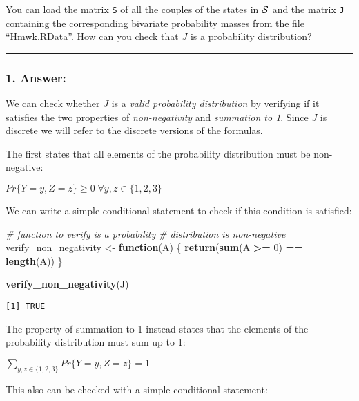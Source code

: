\documentclass[
]{article}
\newenvironment{Shaded}{\begin{snugshade}}{\end{snugshade}}
\newcommand{\CommentTok}[1]{\textcolor[rgb]{0.56,0.35,0.01}{\textit{#1}}}
\newcommand{\ControlFlowTok}[1]{\textcolor[rgb]{0.13,0.29,0.53}{\textbf{#1}}}
\newcommand{\DecValTok}[1]{\textcolor[rgb]{0.00,0.00,0.81}{#1}}
\newcommand{\FunctionTok}[1]{\textcolor[rgb]{0.13,0.29,0.53}{\textbf{#1}}}
\newcommand{\NormalTok}[1]{#1}
\newcommand{\OtherTok}[1]{\textcolor[rgb]{0.56,0.35,0.01}{#1}}
\newcommand{\SpecialCharTok}[1]{\textcolor[rgb]{0.81,0.36,0.00}{\textbf{#1}}}
\begin{document}
You can load the matrix \texttt{S} of all the couples of the states in
\({\cal S}\) and the matrix \texttt{J} containing the corresponding
bivariate probability masses from the file ``Hmwk.RData''. How can you
check that \(J\) is a probability distribution?

\begin{center}\rule{0.5\linewidth}{0.5pt}\end{center}

\hypertarget{answer}{%
\subsubsection{1. Answer:}\label{answer}}

We can check whether \(J\) is a \emph{valid probability distribution} by
verifying if it satisfies the two properties of \emph{non-negativity}
and \emph{summation to 1}. Since \(J\) is discrete we will refer to the
discrete versions of the formulas.

The first states that all elements of the probability distribution must
be non-negative:

\(Pr \{Y=y,Z=z\} \ge 0 \; \forall y,z \in \{1, 2, 3\}\)

We can write a simple conditional statement to check if this condition
is satisfied:

\begin{Shaded}
\begin{Highlighting}[]
\CommentTok{\# function to verify is a probability}
\CommentTok{\# distribution is non{-}negative}
\NormalTok{verify\_non\_negativity }\OtherTok{\textless{}{-}} \ControlFlowTok{function}\NormalTok{(A) \{}
    \FunctionTok{return}\NormalTok{(}\FunctionTok{sum}\NormalTok{(A }\SpecialCharTok{\textgreater{}=} \DecValTok{0}\NormalTok{) }\SpecialCharTok{==} \FunctionTok{length}\NormalTok{(A))}
\NormalTok{\}}

\FunctionTok{verify\_non\_negativity}\NormalTok{(J)}
\end{Highlighting}
\end{Shaded}

\begin{verbatim}
[1] TRUE
\end{verbatim}

The property of summation to 1 instead states that the elements of the
probability distribution must sum up to 1:

\(\sum_{y,z\in\{1,2,3\}}Pr\{Y=y,Z=z\}=1\)

This also can be checked with a simple conditional statement:
\end{document}
